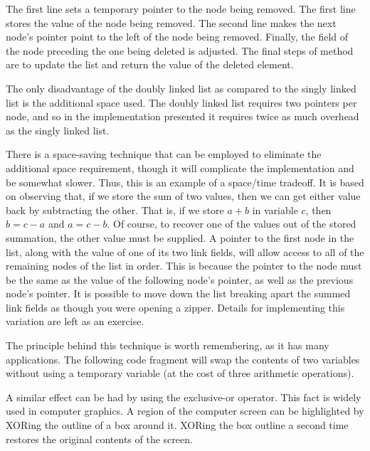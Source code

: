 {The first line sets a temporary pointer to the node being removed.}{}
{The first line stores the value of the node being removed.}{}
The second line makes the next node's  pointer point to the
left of the node being removed.
Finally, the  field of the node preceding the one being
deleted is adjusted.
The final steps of method  are to update the
list
and return the value of the deleted element.

The only disadvantage of the doubly linked list as compared to the
singly linked list is the additional space used.
The doubly linked list requires two pointers per node, and so in the
implementation presented it requires twice as much overhead as
the singly linked list.


\begin{example}
\label{DblSUM}

There is a space-saving technique that can be employed to eliminate
the additional space requirement, though it will complicate the
implementation and be somewhat slower.
Thus, this is an example of a
space/time tradeoff.
It is based on observing that, if we store the sum of two values, then
we can get either value back by subtracting the other.
That is, if we store \(a + b\) in variable \(c\), then
\(b = c - a\) and \(a = c - b\).
Of course, to recover one of the values out of the stored summation,
the other value must be supplied.
A pointer to the first node in the list, along with the value of one
of its two link fields, will allow access to all of the remaining
nodes of the list in order.
This is because the pointer to the node must be the same as the value
of the following node's  pointer, as well as the previous
node's  pointer.
It is possible to move down the list breaking apart the
summed link fields as though you were opening a zipper.
Details for implementing this variation are left as an exercise.


The principle behind this technique is worth remembering, as it
has many applications.
The following code fragment will
swap the contents of two variables without using a temporary variable
(at the cost of three arithmetic operations).
\vspace{-\smallskipamount}


A similar effect can be had by using the exclusive-or operator.
This fact is widely used in computer graphics.
A region of the computer screen can be highlighted by
XORing the outline of a box around it.
XORing the box outline a second time restores the original
contents of the screen.
\end{example}

